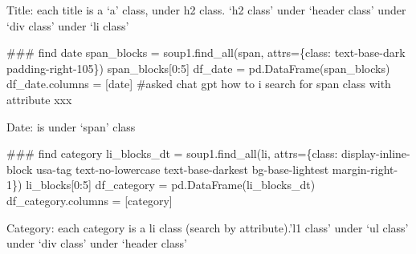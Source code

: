 \documentclass[
  letterpaper,
  DIV=11,
  numbers=noendperiod]{scrartcl}
\newenvironment{Shaded}{\begin{snugshade}}{\end{snugshade}}
\newcommand{\CommentTok}[1]{\textcolor[rgb]{0.37,0.37,0.37}{#1}}
\newcommand{\DecValTok}[1]{\textcolor[rgb]{0.68,0.00,0.00}{#1}}
\newcommand{\NormalTok}[1]{\textcolor[rgb]{0.00,0.23,0.31}{#1}}
\newcommand{\OperatorTok}[1]{\textcolor[rgb]{0.37,0.37,0.37}{#1}}
\newcommand{\StringTok}[1]{\textcolor[rgb]{0.13,0.47,0.30}{#1}}
\begin{document}
Title: each title is a `a' class, under h2 class. `h2 class' under
`header class' under `div class' under `li class'

\begin{Shaded}
\begin{Highlighting}[]
\CommentTok{\#\#\# find date}
\NormalTok{span\_blocks }\OperatorTok{=}\NormalTok{ soup1.find\_all(}\StringTok{\textquotesingle{}span\textquotesingle{}}\NormalTok{, attrs}\OperatorTok{=}\NormalTok{\{}\StringTok{\textquotesingle{}class\textquotesingle{}}\NormalTok{: }\StringTok{\textquotesingle{}text{-}base{-}dark padding{-}right{-}105\textquotesingle{}}\NormalTok{\})}
\NormalTok{span\_blocks[}\DecValTok{0}\NormalTok{:}\DecValTok{5}\NormalTok{]}
\NormalTok{df\_date }\OperatorTok{=}\NormalTok{ pd.DataFrame(span\_blocks) }
\NormalTok{df\_date.columns }\OperatorTok{=}\NormalTok{ [}\StringTok{\textquotesingle{}date\textquotesingle{}}\NormalTok{]}
\CommentTok{\#asked chat gpt \textquotesingle{}how to i search for \textquotesingle{}span\textquotesingle{} class with attribute xxx\textquotesingle{}}
\end{Highlighting}
\end{Shaded}

Date: is under `span' class

\begin{Shaded}
\begin{Highlighting}[]
\CommentTok{\#\#\# find category}
\NormalTok{li\_blocks\_dt }\OperatorTok{=}\NormalTok{ soup1.find\_all(}\StringTok{\textquotesingle{}li\textquotesingle{}}\NormalTok{, attrs}\OperatorTok{=}\NormalTok{\{}\StringTok{\textquotesingle{}class\textquotesingle{}}\NormalTok{: }\StringTok{\textquotesingle{}display{-}inline{-}block usa{-}tag text{-}no{-}lowercase text{-}base{-}darkest bg{-}base{-}lightest margin{-}right{-}1\textquotesingle{}}\NormalTok{\})}
\NormalTok{li\_blocks[}\DecValTok{0}\NormalTok{:}\DecValTok{5}\NormalTok{]}
\NormalTok{df\_category }\OperatorTok{=}\NormalTok{ pd.DataFrame(li\_blocks\_dt)}
\NormalTok{df\_category.columns }\OperatorTok{=}\NormalTok{ [}\StringTok{\textquotesingle{}category\textquotesingle{}}\NormalTok{]}
\end{Highlighting}
\end{Shaded}

Category: each category is a li class (search by attribute).'l1 class'
under `ul class' under `div class' under `header class'
\end{document}
